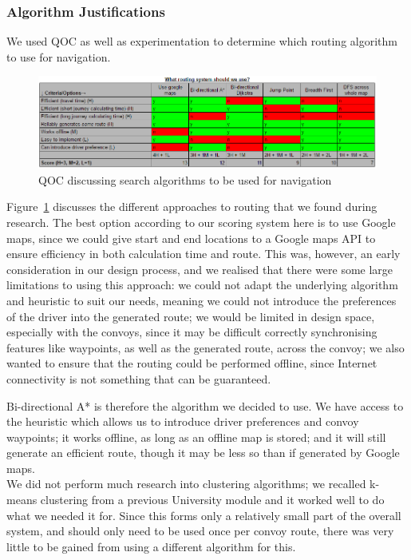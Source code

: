 \documentclass{article}
\begin{document}
\subsubsection{Algorithm Justifications}\label{sssec:nav-design-alg}
We used QOC as well as experimentation to determine which routing algorithm to use for navigation.

\begin{figure}[H]
  \centering
  \includegraphics[width=\linewidth]{qoc-nav-routing}
  \caption{QOC discussing search algorithms to be used for navigation}\label{qoc-nav-routing}
\end{figure}
Figure~\ref{qoc-nav-routing} discusses the different approaches to routing that we found during research. The best option according to our scoring system here is to use Google maps, since we could give start and end locations to a Google maps API to ensure efficiency in both calculation time and route. This was, however, an early consideration in our design process, and we realised that there were some large limitations to using this approach: we could not adapt the underlying algorithm and heuristic to suit our needs, meaning we could not introduce the preferences of the driver into the generated route; we would be limited in design space, especially with the convoys, since it may be difficult correctly synchronising features like waypoints, as well as the generated route, across the convoy; we also wanted to ensure that the routing could be performed offline, since Internet connectivity is not something that can be guaranteed.

Bi-directional A* is therefore the algorithm we decided to use. We have access to the heuristic which allows us to introduce driver preferences and convoy waypoints; it works offline, as long as an offline map is stored; and it will still generate an efficient route, though it may be less so than if generated by Google maps.\\

We did not perform much research into clustering algorithms; we recalled k-means clustering from a previous University module and it worked well to do what we needed it for. Since this forms only a relatively small part of the overall system, and should only need to be used once per convoy route, there was very little to be gained from using a different algorithm for this.
\end{document}
